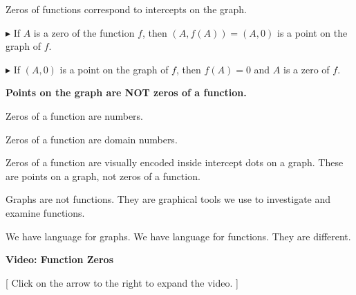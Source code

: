 \documentclass{ximera}
\begin{document}
Zeros of functions correspond to intercepts on the graph.



$\blacktriangleright$ If $A$ is a zero of the function $f$, then $(A, f(A)) = (A, 0)$ is a point on the graph of $f$. 


$\blacktriangleright$ If $(A, 0)$ is a point on the graph of $f$, then $f(A) = 0$ and $A$ is a zero of $f$.





\begin{warning}

\begin{center}

\textbf{\textcolor{red!70!black}{Points on the graph are NOT zeros of a function.}}

\end{center}


Zeros of a function are numbers. 

Zeros of a function are domain numbers. 

Zeros of a function are visually encoded inside intercept dots on a graph.  These are points on a graph, not zeros of a function. 


Graphs are not functions.  They are graphical tools we use to investigate and examine functions. 


We have language for graphs.  We have language for functions.  They are different.


\end{warning}





\begin{explanation} \textbf{\textcolor{red!75!green}{Video: Function Zeros}}

[ Click on the arrow to the right to expand the video. ]
\begin{expandable} 

\begin{center}
\end{center}

\end{expandable}
\end{explanation}
\end{document}
